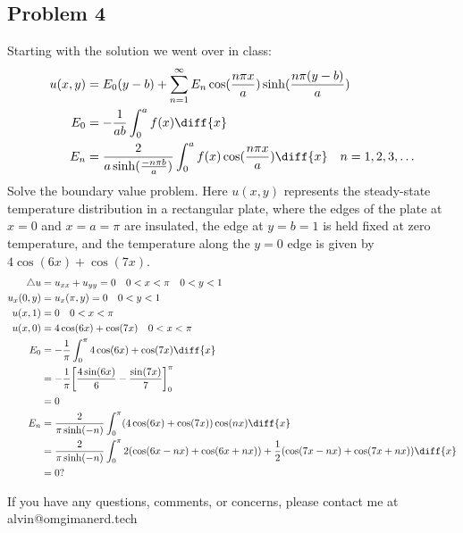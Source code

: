\documentclass{math}
\begin{document}
\subsection*{Problem 4}
Starting with the solution we went over in class:
\begin{align*}
  u(x,y) &= E_0(y-b)+\sum_{n=1}^{\infty}
    E_n\cos(\frac{n\pi x}{a})\sinh(\frac{n\pi(y-b)}{a}) \\
  E_0 &= -\frac{1}{ab}\int_{0}^{a}f(x)\diff{x} \\
  E_n &= \frac{2}{a\sinh(\frac{-n\pi b}{a})}
    \int_{0}^{a}f(x)\cos(\frac{n\pi x}{a})\diff{x} \quad n = 1,2,3,\dots \\
\end{align*}
Solve the boundary value problem. Here \( u(x,y) \) represents the steady-state
temperature distribution in a rectangular plate, where the edges of the plate
at \( x = 0 \) and \( x = a = \pi \) are insulated, the edge at \( y = b = 1 \)
is held fixed at zero temperature, and the temperature along the \( y = 0 \)
edge is given by \( 4\cos(6x)+\cos(7x) \).
\begin{align*}
  \triangle u &= u_{xx}+u_{yy} = 0 \quad 0<x<\pi \quad 0<y<1 \\
  u_x(0,y) &= u_x(\pi,y) = 0 \quad 0<y<1 \\
  u(x,1) &= 0 \quad 0<x<\pi \\
  u(x,0) &= 4\cos(6x)+\cos(7x) \quad 0<x<\pi \\
  E_0 &= -\frac{1}{\pi}\int_{0}^{\pi}4\cos(6x)+\cos(7x)\diff{x} \\
  &= -\frac{1}{\pi}
    \bigg[\frac{4\sin(6x)}{6}-\frac{\sin(7x)}{7}\bigg]_{0}^{\pi} \\
  &= 0 \\
  E_n &= \frac{2}{\pi\sinh(-n)}
    \int_{0}^{\pi}(4\cos(6x)+\cos(7x))\cos(nx)\diff{x} \\
  &= \frac{2}{\pi\sinh(-n)}\int_{0}^{\pi}2(\cos(6x-nx)+\cos(6x+nx))+
    \frac{1}{2}(\cos(7x-nx)+\cos(7x+nx))\diff{x} \\
  &= 0?
\end{align*}

\begin{center}
  If you have any questions, comments, or concerns, please contact me at
  alvin@omgimanerd.tech
\end{center}
\end{document}
